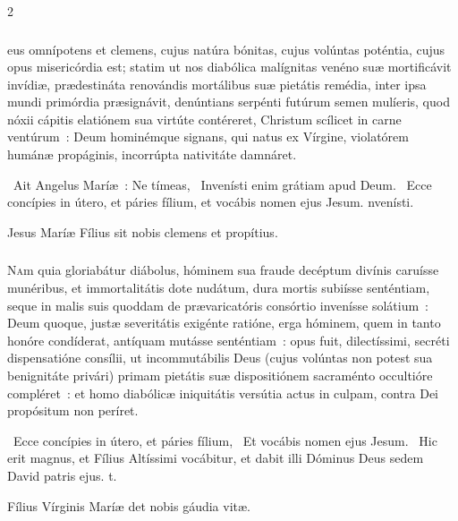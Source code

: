 \documentclass[9pt,twoside]{extarticle}
\begin{document}
\begin{multicols}{2}
\subsubsection*{\center {}}
eus omnípotens et clemens, cujus natúra bónitas, cujus volúntas poténtia, cujus opus misericórdia est; statim ut nos diabólica malígnitas venéno suæ mortificávit invídiæ, prædestináta renovándis mortálibus suæ pietátis remédia, inter ipsa mundi primórdia præsignávit, denúntians serpénti futúrum semen mulíeris, quod nóxii cápitis elatiónem sua virtúte contéreret, Christum scílicet in carne ventúrum~: Deum hominémque signans, qui natus ex Vírgine, violatórem humánæ propáginis, incorrúpta nativitáte damnáret.

\begin{tightlist}{}
\item {}~Ait Angelus Maríæ~: Ne tímeas, \textred{*}~Invenísti enim grátiam apud Deum. ~Ecce concípies in útero, et páries fílium, et vocábis nomen ejus Jesum. nvenísti.
\item {\small {} Jesus Maríæ Fílius sit nobis clemens et propítius.}
\end{tightlist}

\subsubsection*{\center {}}
\lettrine{N}am quia gloriabátur diábolus, hóminem sua fraude decéptum divínis caruísse munéribus, et immortalitátis dote nudátum, dura mortis subiísse senténtiam, seque in malis suis quoddam de prævaricatóris consórtio invenísse solátium~: Deum quoque, justæ severitátis exigénte ratióne, erga hóminem, quem in tanto honóre condíderat, antíquam mutásse senténtiam~: opus fuit, dilectíssimi, secréti dispensatióne consílii, ut incommutábilis Deus (cujus volúntas non potest sua benignitáte privári) primam pietátis suæ dispositiónem sacraménto occultióre compléret~: et homo diabólicæ iniquitátis versútia actus in culpam, contra Dei propósitum non períret.

\begin{tightlist}{}
\item {}~Ecce concípies in útero, et páries fílium, \textred{*}~Et vocábis nomen ejus Jesum. ~Hic erit magnus, et Fílius Altíssimi vocábitur, et dabit illi Dóminus Deus sedem David patris ejus. t.
\item {\small {} Fílius Vírginis Maríæ det nobis gáudia vitæ.}
\end{tightlist}


\end{multicols}
\end{document}
